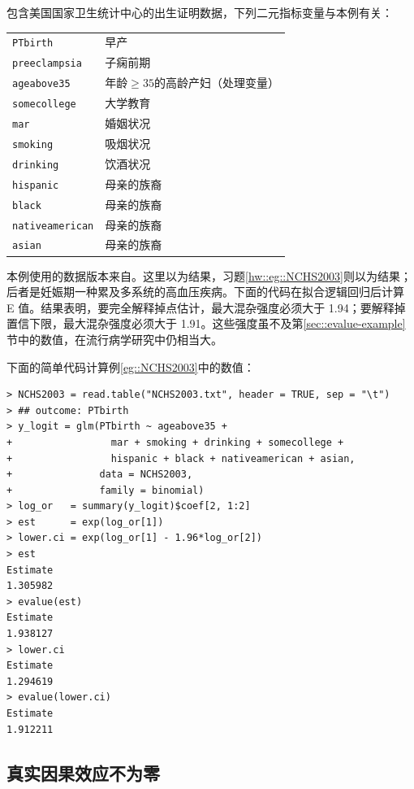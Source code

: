 \begin{example}
\label{eg::NCHS2003}
包含美国国家卫生统计中心的出生证明数据，下列二元指标变量与本例有关：


 

\begin{tabular}{ll}
\hline 
\texttt{PTbirth} &
 早产 \\
\texttt{preeclampsia} &
 子痫前期 \\
\texttt{ageabove35}& 
 年龄$\geq 35$的高龄产妇（处理变量） \\
\texttt{somecollege}&
 大学教育 \\
\texttt{mar}& 
 婚姻状况 \\
\texttt{smoking}& 
 吸烟状况 \\
\texttt{drinking}& 
 饮酒状况 \\
\texttt{hispanic}& 
 母亲的族裔  \\
\texttt{black}& 
 母亲的族裔  \\
\texttt{nativeamerican}& 
 母亲的族裔 \\
\texttt{asian}& 
 母亲的族裔\\
 \hline 
\end{tabular} 



本例使用的数据版本来自\citet{valeri2014estimation}。这里以为结果，习题\ref{hw::eg::NCHS2003}则以为结果；后者是妊娠期一种累及多系统的高血压疾病。下面的代码在拟合逻辑回归后计算 E 值。结果表明，要完全解释掉点估计，最大混杂强度必须大于 1.94；要解释掉置信下限，最大混杂强度必须大于 1.91。这些强度虽不及第\ref{sec::evalue-example}节中的数值，在流行病学研究中仍相当大。 
\end{example}


下面的简单代码计算例\ref{eg::NCHS2003}中的数值： 
 \begin{lstlisting}
> NCHS2003 = read.table("NCHS2003.txt", header = TRUE, sep = "\t")
> ## outcome: PTbirth
> y_logit = glm(PTbirth ~ ageabove35 + 
+                 mar + smoking + drinking + somecollege + 
+                 hispanic + black + nativeamerican + asian,
+               data = NCHS2003, 
+               family = binomial)
> log_or   = summary(y_logit)$coef[2, 1:2]
> est      = exp(log_or[1])
> lower.ci = exp(log_or[1] - 1.96*log_or[2])
> est
Estimate 
1.305982 
> evalue(est)
Estimate 
1.938127 
> lower.ci
Estimate 
1.294619 
> evalue(lower.ci)
Estimate 
1.912211 
\end{lstlisting}


\subsection{真实因果效应不为零}
 
